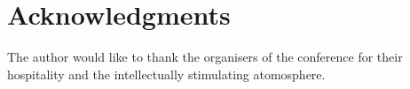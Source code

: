 \documentclass[a4paper]{article}
\begin{document}
  
\section*{Acknowledgments}
The author would like to thank the organisers of the conference for 
their hospitality and the intellectually stimulating atomosphere.



%
\end{document}
